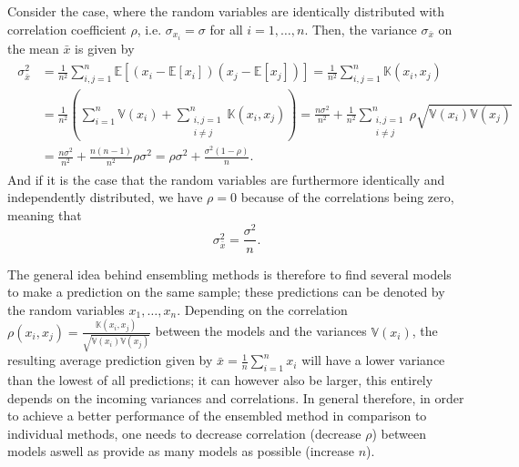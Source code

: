 \documentclass[a4paper,11pt]{article}
\numberwithin{equation}{section}
\begin{document}
{		Consider the case, where the random variables are identically distributed with correlation coefficient $\rho$, i.e. $\sigma_{x_i} = \sigma$ for all $i=1,\dots,n$. Then, the variance $\sigma_{\bar{x}}$ on the mean $\bar{x}$ is given by \begin{align}\begin{aligned}
				\sigma_{\bar{x}}^2 &=\frac{1}{n^2}\sum_{i,j=1}^{n}\mathbb{E}\left[(x_i-\mathbb{E}[x_i])(x_j-\mathbb{E}[x_j])\right] = \frac{1}{n^2}\sum_{i,j=1}^{n}\mathbb{K}(x_i,x_j) \\ &= \frac{1}{n^2}\left(\sum_{i=1}^{n}\mathbb{V}(x_i)+\sum_{\substack{i,j=1 \\ i\neq j}}^{n}\mathbb{K}(x_i,x_j)\right) = \frac{n\sigma^2}{n^2}+ \frac{1}{n^2}\sum_{\substack{i,j=1 \\ i\neq j}}^{n}\rho \sqrt{\mathbb{V}(x_i)\mathbb{V}(x_j)} \\ &= \frac{n\sigma^2}{n^2} + \frac{n(n-1)}{n^2}\rho\sigma^2 = \rho\sigma^2 + \frac{\sigma^2(1-\rho)}{n}.
		\end{aligned}\end{align} And if it is the case that the random variables are furthermore identically and independently distributed, we have $\rho=0$ because of the correlations being zero, meaning that \begin{equation}
			\sigma_{\bar{x}}^2 = \frac{\sigma^2}{n}.
		\end{equation}
		
		The general idea behind ensembling methods is therefore to find several models to make a prediction on the same sample; these predictions can be denoted by the random variables $x_1,\dots,x_n$. Depending on the correlation $\rho(x_i,x_j)=\frac{\mathbb{K}(x_i,x_j)}{\sqrt{\mathbb{V}(x_i)\mathbb{V}(x_j)}}$ between the models and the variances $\mathbb{V}(x_i)$, the resulting average prediction given by $\bar{x} = \frac{1}{n}\sum_{i=1}^nx_i$ will have a lower variance than the lowest of all predictions; it can however also be larger, this entirely depends on the incoming variances and correlations. In general therefore, in order to achieve a better performance of the ensembled method in comparison to individual methods, one needs to decrease correlation (decrease $\rho$) between models aswell as provide as many models as possible (increase $n$).
}

\end{document}
